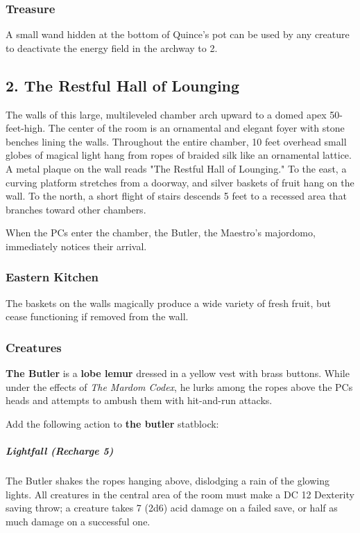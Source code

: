 \documentclass[10pt,a4paper,twoside,bg=print,twocolumn,openany,nodeprecatedcode]{dndbook}
\begin{document}
\subsubsection{Treasure}
A small wand hidden at the bottom of Quince's pot can be used by any creature to deactivate the energy field in the archway to 2.

\subsection{2. The Restful Hall of Lounging}
\begin{DndReadAloud}{}
The walls of this large, multileveled chamber arch upward to a domed apex 50-feet-high. The center of the room is an ornamental and elegant foyer with stone benches lining the walls. Throughout the entire chamber, 10 feet overhead small globes of magical light hang from ropes of braided silk like an ornamental lattice. A metal plaque on the wall reads "The Restful Hall of Lounging." To the east, a curving platform stretches from a doorway, and silver baskets of fruit hang on the wall. To the north, a short flight of stairs descends 5 feet to a recessed area that branches toward other chambers.

\end{DndReadAloud}

When the PCs enter the chamber, the Butler, the Maestro's majordomo, immediately notices their arrival.

\subsubsection{Eastern Kitchen}
The baskets on the walls magically produce a wide variety of fresh fruit, but cease functioning if removed from the wall.

\subsubsection{Creatures}
\textbf{The Butler} is a \textbf{lobe lemur} dressed in a yellow vest with brass buttons. While under the effects of \textit{The Mardom Codex}, he lurks among the ropes above the PCs heads and attempts to ambush them with hit-and-run attacks.

Add the following action to \textbf{the butler} statblock:

\subparagraph{Lightfall (Recharge 5)}
The Butler shakes the ropes hanging above, dislodging a rain of the glowing lights. All creatures in the central area of the room must make a DC 12 Dexterity saving throw; a creature takes 7 (2d6) acid damage on a failed save, or half as much damage on a successful one.
\end{document}
